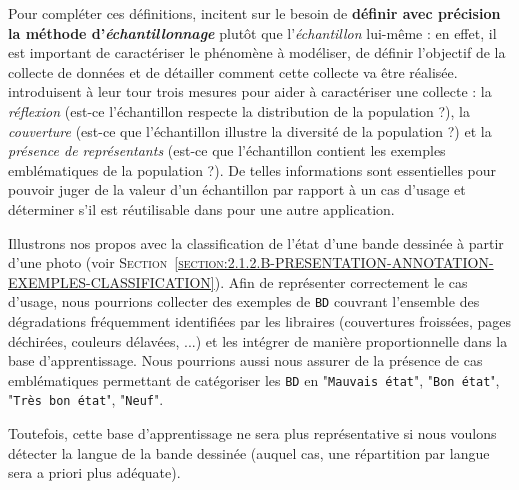 			Pour compléter ces définitions, \cite{kruskal-mosteller:1979:representative-sampling-ii} incitent sur le besoin de \textbf{définir avec précision la méthode d'\textit{échantillonnage}} plutôt que l'\textit{échantillon} lui-même : en effet, il est important de caractériser le phénomène à modéliser, de définir l'objectif de la collecte de données et de détailler comment cette collecte va être réalisée.
			\cite{clemmensen-kjaersgaard:2022:data-representativity-machine} introduisent à leur tour trois mesures pour aider à caractériser une collecte : la \textit{réflexion} (est-ce l'échantillon respecte la distribution de la population ?), la \textit{couverture} (est-ce que l'échantillon illustre la diversité de la population ?) et la \textit{présence de représentants} (est-ce que l'échantillon contient les exemples emblématiques de la population ?).
			De telles informations sont essentielles pour pouvoir juger de la valeur d'un échantillon par rapport à un cas d'usage et déterminer s'il est réutilisable dans pour une autre application.
			\begin{leftBarExamples}
				Illustrons nos propos avec la classification de l'état d'une bande dessinée à partir d'une photo (voir \textsc{Section~\ref{section:2.1.2.B-PRESENTATION-ANNOTATION-EXEMPLES-CLASSIFICATION}}).
				Afin de représenter correctement le cas d'usage, nous pourrions collecter des exemples de \texttt{BD} couvrant l'ensemble des dégradations fréquemment identifiées par les libraires (couvertures froissées, pages déchirées, couleurs délavées, ...) et les intégrer de manière proportionnelle dans la base d'apprentissage.
				Nous pourrions aussi nous assurer de la présence de cas emblématiques permettant de catégoriser les \texttt{BD} en "\texttt{Mauvais état}", "\texttt{Bon état}", "\texttt{Très bon état}", "\texttt{Neuf}".
				
				Toutefois, cette base d'apprentissage ne sera plus représentative si nous voulons détecter la langue de la bande dessinée (auquel cas, une répartition par langue sera a priori plus adéquate).
			\end{leftBarExamples}
			
